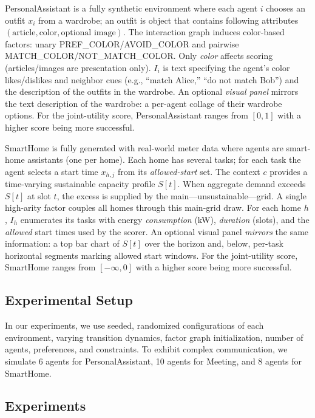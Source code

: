  PersonalAssistant is a fully synthetic environment where each agent \(i\) chooses an outfit \(x_i\) from a wardrobe; an outfit is object that contains following attributes \((\text{article}, \text{color}, \text{optional image})\).
The interaction graph induces color-based factors:
unary \textsc{PREF\_COLOR}/\textsc{AVOID\_COLOR} and pairwise \textsc{MATCH\_COLOR}/\textsc{NOT\_MATCH\_COLOR}.
Only \emph{color} affects scoring (articles/images are presentation only). \(I_i\) is text specifying the agent’s color likes/dislikes and neighbor cues (e.g., “match Alice,” “do not match Bob”) and the description of the outfits in the wardrobe. An optional \emph{visual panel} mirrors the text description of the wardrobe: a per-agent collage of their wardrobe options. For the joint-utility score, PersonalAssistant ranges from $[0,1]$ with a higher score being more successful.


 SmartHome is fully generated with real-world meter data where agents are smart-home assistants (one per home). Each home has several tasks; for each task the agent selects a start time \(x_{h,j}\) from its \emph{allowed-start} set. The context \(c\) provides a time-varying sustainable capacity profile \(S[t]\). When aggregate demand exceeds \(S[t]\) at slot \(t\), the excess is supplied by the main—unsustainable—grid. A single high-arity factor couples all homes through this main-grid draw. For each home \(h\), \(I_h\) enumerates its tasks with energy \emph{consumption} (kW), \emph{duration} (slots), and the \emph{allowed} start times used by the scorer. An optional visual panel \emph{mirrors} the same information: a top bar chart of \(S[t]\) over the horizon and, below, per-task horizontal segments marking allowed start windows. For the joint-utility score, SmartHome ranges from $[-\infty, 0]$ with a higher score being more successful.


\subsection{Experimental Setup}
In our experiments, we use seeded, randomized configurations of each environment, varying transition dynamics, factor graph initialization, number of agents, preferences, and constraints. To exhibit complex communication, we simulate 6 agents for PersonalAssistant, 10 agents for Meeting, and 8 agents for SmartHome.


\subsection{Experiments}

